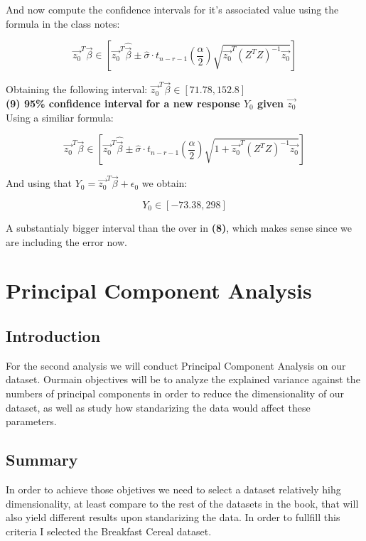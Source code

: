 \documentclass[11pt,a4paper]{article}
\begin{document}
	And now compute the confidence intervals for it's associated value using the formula in the class notes:
	
	$$ \vec{z_0}^T \vec{\beta} \in [\vec{z_0}^T \hat{\vec{\beta}} \pm \hat{\sigma} \cdot t_{n-r-1}(\frac{\alpha}{2}) \sqrt{\vec{z_0}^T (Z^T Z)^{-1} \vec{z_0}} ] $$
	
	Obtaining the following interval: $ \vec{z_0}^T \vec{\beta} \in [ 71.78 , 152.8 ] $ \\
	
	\textbf{(9) 95\% confidence interval for a new response $Y_0$ given $\vec{z_0}$} \\
	
	Using a similiar formula: 
	
	$$ \vec{z_0}^T \vec{\beta} \in [\vec{z_0}^T \hat{\vec{\beta}} \pm \hat{\sigma} \cdot t_{n-r-1}(\frac{\alpha}{2}) \sqrt{1 + \vec{z_0}^T (Z^T Z)^{-1} \vec{z_0}} ] $$
	
	And using that $Y_0 = \vec{z_0}^T \vec{\beta} + \epsilon_0$ we obtain:
	
	$$ Y_0 \in [ -73.38 , 298 ] $$
	
	A substantialy bigger interval than the over in \textbf{(8)}, which makes sense since we are including the error now.
	
	\section{Principal Component Analysis}
	
	\subsection{Introduction}
	
	For the second analysis we will conduct Principal Component Analysis on our dataset. Ourmain objectives will be to analyze the explained variance against the numbers of principal components in order to reduce the dimensionality of our dataset, as well as study how standarizing the data would affect these parameters.
	
	\subsection{Summary}
	
	In order to achieve those objetives we need to select a dataset relatively hihg dimensionality, at least compare to the rest of the datasets in the book, that will also yield different results upon standarizing the data. In order to fullfill this criteria I selected the Breakfast Cereal dataset. \\
	
\end{document}
